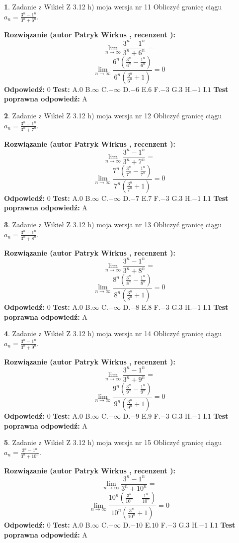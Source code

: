 \documentclass[12pt, a4paper]{article}
\theoremstyle{definition} %
\newtheorem{zad}{}
\newcommand{\zadStart}[1]{\begin{zad}#1\newline}
\newcommand{\zadStop}{\end{zad}}
\newcommand{\rozwStart}[2]{\noindent \textbf{Rozwiązanie (autor #1 , recenzent #2): }\newline}
\newcommand{\rozwStop}{\newline}
\newcommand{\odpStart}{\noindent \textbf{Odpowiedź:}\newline}
\newcommand{\odpStop}{\newline}
\newcommand{\testStart}{\noindent \textbf{Test:}\newline}
\newcommand{\testStop}{\newline}
\newcommand{\kluczStart}{\noindent \textbf{Test poprawna odpowiedź:}\newline}
\newcommand{\kluczStop}{\newline}
\begin{document}
\zadStart{Zadanie z Wikieł Z 3.12 h) moja wersja nr 11}
Obliczyć granicę ciągu $a_{n}=\frac{3^{n} - 1^{n}}{3^{n} + 6^{n}}$.
\zadStop
\rozwStart{Patryk Wirkus}{}
$$\lim\limits_{n\to\infty}\frac{3^{n} - 1^{n}}{3^{n} + 6^{n}}=$$
$$\lim\limits_{n\to\infty}\frac{6^{n}(\frac{3^{n}}{6^{n}} - \frac{1^{n}}{6^{n}})}{6^{n}(\frac{3^{n}}{6^{n}} + 1)} = 0$$
\rozwStop
\odpStart
$0$
\odpStop
\testStart
A.$0$
B.$\infty$
C.$-\infty$
D.$-6$
E.$6$
F.$-3$
G.$3$
H.$-1$
I.$1$
\testStop
\kluczStart
A
\kluczStop



\zadStart{Zadanie z Wikieł Z 3.12 h) moja wersja nr 12}
Obliczyć granicę ciągu $a_{n}=\frac{3^{n} - 1^{n}}{3^{n} + 7^{n}}$.
\zadStop
\rozwStart{Patryk Wirkus}{}
$$\lim\limits_{n\to\infty}\frac{3^{n} - 1^{n}}{3^{n} + 7^{n}}=$$
$$\lim\limits_{n\to\infty}\frac{7^{n}(\frac{3^{n}}{7^{n}} - \frac{1^{n}}{7^{n}})}{7^{n}(\frac{3^{n}}{7^{n}} + 1)} = 0$$
\rozwStop
\odpStart
$0$
\odpStop
\testStart
A.$0$
B.$\infty$
C.$-\infty$
D.$-7$
E.$7$
F.$-3$
G.$3$
H.$-1$
I.$1$
\testStop
\kluczStart
A
\kluczStop



\zadStart{Zadanie z Wikieł Z 3.12 h) moja wersja nr 13}
Obliczyć granicę ciągu $a_{n}=\frac{3^{n} - 1^{n}}{3^{n} + 8^{n}}$.
\zadStop
\rozwStart{Patryk Wirkus}{}
$$\lim\limits_{n\to\infty}\frac{3^{n} - 1^{n}}{3^{n} + 8^{n}}=$$
$$\lim\limits_{n\to\infty}\frac{8^{n}(\frac{3^{n}}{8^{n}} - \frac{1^{n}}{8^{n}})}{8^{n}(\frac{3^{n}}{8^{n}} + 1)} = 0$$
\rozwStop
\odpStart
$0$
\odpStop
\testStart
A.$0$
B.$\infty$
C.$-\infty$
D.$-8$
E.$8$
F.$-3$
G.$3$
H.$-1$
I.$1$
\testStop
\kluczStart
A
\kluczStop



\zadStart{Zadanie z Wikieł Z 3.12 h) moja wersja nr 14}
Obliczyć granicę ciągu $a_{n}=\frac{3^{n} - 1^{n}}{3^{n} + 9^{n}}$.
\zadStop
\rozwStart{Patryk Wirkus}{}
$$\lim\limits_{n\to\infty}\frac{3^{n} - 1^{n}}{3^{n} + 9^{n}}=$$
$$\lim\limits_{n\to\infty}\frac{9^{n}(\frac{3^{n}}{9^{n}} - \frac{1^{n}}{9^{n}})}{9^{n}(\frac{3^{n}}{9^{n}} + 1)} = 0$$
\rozwStop
\odpStart
$0$
\odpStop
\testStart
A.$0$
B.$\infty$
C.$-\infty$
D.$-9$
E.$9$
F.$-3$
G.$3$
H.$-1$
I.$1$
\testStop
\kluczStart
A
\kluczStop



\zadStart{Zadanie z Wikieł Z 3.12 h) moja wersja nr 15}
Obliczyć granicę ciągu $a_{n}=\frac{3^{n} - 1^{n}}{3^{n} + 10^{n}}$.
\zadStop
\rozwStart{Patryk Wirkus}{}
$$\lim\limits_{n\to\infty}\frac{3^{n} - 1^{n}}{3^{n} + 10^{n}}=$$
$$\lim\limits_{n\to\infty}\frac{10^{n}(\frac{3^{n}}{10^{n}} - \frac{1^{n}}{10^{n}})}{10^{n}(\frac{3^{n}}{10^{n}} + 1)} = 0$$
\rozwStop
\odpStart
$0$
\odpStop
\testStart
A.$0$
B.$\infty$
C.$-\infty$
D.$-10$
E.$10$
F.$-3$
G.$3$
H.$-1$
I.$1$
\testStop
\kluczStart
A
\kluczStop
\end{document}
